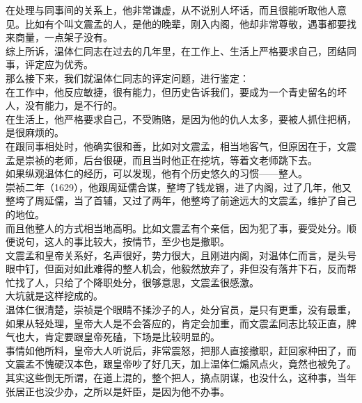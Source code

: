 \begin{multicols}{\theparacolNo}
在处理与同事间的关系上，他非常谦虚，从不说别人坏话，而且很能听取他人意见。比如有个叫文震孟的人，是他的晚辈，刚入内阁，他却非常尊敬，遇事都要找来商量，一点架子没有。\\

综上所诉，温体仁同志在过去的几年里，在工作上、生活上严格要求自己，团结同事，评定应为优秀。\\

那么接下来，我们就温体仁同志的评定问题，进行鉴定：\\

在工作中，他反应敏捷，很有能力，但历史告诉我们，要成为一个青史留名的坏人，没有能力，是不行的。\\

在生活上，他严格要求自己，不受贿赂，是因为他的仇人太多，要被人抓住把柄，是很麻烦的。\\

在跟同事相处时，他确实很和善，比如对文震孟，相当地客气，但原因在于，文震孟是崇祯的老师，后台很硬，而且当时他正在挖坑，等着文老师跳下去。\\

如果纵观温体仁的经历，可以发现，他有个历史悠久的习惯——整人。\\

崇祯二年（1629），他跟周延儒合谋，整垮了钱龙锡，进了内阁，过了几年，他又整垮了周延儒，当了首辅，又过了两年，他整垮了前途远大的文震孟，维护了自己的地位。\\

而且他整人的方式相当地高明。比如文震孟有个亲信，因为犯了事，要受处分。顺便说句，这人的事比较大，按情节，至少也是撤职。\\

文震孟和皇帝关系好，名声很好，势力很大，且刚进内阁，对温体仁而言，是头号眼中钉，但面对如此难得的整人机会，他毅然放弃了，非但没有落井下石，反而帮忙找了人，只给了个降职处分，很够意思，文震孟很感激。\\

大坑就是这样挖成的。\\

温体仁很清楚，崇祯是个眼睛不揉沙子的人，处分官员，是只有更重，没有最重，如果从轻处理，皇帝大人是不会答应的，肯定会加重，而文震孟同志比较正直，脾气也大，肯定要跟皇帝死磕，下场是比较明显的。\\

事情如他所料，皇帝大人听说后，非常震怒，把那人直接撤职，赶回家种田了，而文震孟不愧硬汉本色，跟皇帝吵了好几天，加上温体仁煽风点火，竟然也被免了。\\

其实这些倒无所谓，在道上混的，整个把人，搞点阴谋，也没什么，这种事，当年张居正也没少办，之所以是奸臣，是因为他不办事。\\


\end{multicols}
